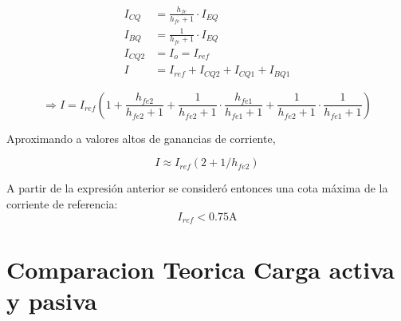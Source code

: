 \begin{align*}
    I_{CQ} &= \frac{h_{fe}}{h_{fe}+1} \cdot I_{EQ} \\
    I_{BQ} &= \frac{1}{h_{fe}+1} \cdot I_{EQ}\\
    I_{CQ2} &= I_o = I_{ref} \\
    I &= I_{ref} + I_{CQ2} + I_{CQ1} + I_{BQ1}
\end{align*}

\begin{equation}
    \Rightarrow I = I_{ref} \left(1 + \frac{h_{fe2}}{h_{fe2}+1} + \frac{1}{h_{fe2}+1}\cdot\frac{h_{fe1}}{h_{fe1}+1}+\frac{1}{h_{fe2}+1}\cdot\frac{1}{h_{fe1}+1}\right)
\end{equation}

Aproximando a valores altos de ganancias de corriente,

\begin{equation}
    I \approx I_{ref}\left(2+1/h_{fe2}\right)
\end{equation}

A partir de la expresión anterior se consideró entonces una cota máxima de la corriente de referencia:
\begin{equation}
    I_{ref} < 0.75 \si{\ampere}
    \label{eq:Iref}
\end{equation}

\section{Comparacion Teorica Carga activa y pasiva}

